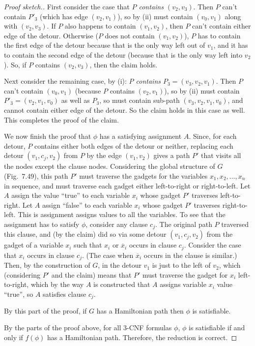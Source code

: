 \documentclass[11pt]{article}
\begin{document}
\begin{proof}[Proof sketch.]
  First consider the case that \emph{$P$ contains $(v_2,v_3)$}.
  Then $P$ can't contain $P'_3$ (which has edge $(v_2,v_1)$),
  so by (ii) must contain $(v_0,v_1)$ along with $(v_2,v_3)$.
  If $P$ also happens to contain $(v_1,v_2)$, 
  then $P$ can't contain either edge of the detour.
  Otherwise ($P$ does not contain $(v_1,v_2)$),
  $P$ has to contain the first edge of the detour
  because that is the only way left out of $v_1$,
  and it has to contain the second edge of the detour
  (because that is the only way left into $v_2$).
  So, if $P$ contains $(v_2,v_3)$, then the claim holds.

  Next consider the remaining case, by (i):
  \emph{$P$ contains $P_3=(v_3,v_2,v_1)$}.
  Then $P$ can't contain $(v_0,v_1)$ (because $P$ contains $(v_2,v_1)$),
  so by (ii) must contain $P'_3=(v_2,v_1,v_0)$ as well as $P_3$,
  so must contain sub-path $(v_3,v_2,v_1,v_0)$,
  and cannot contain either edge of the detour.
  So the claim holds in this case as well.
  This completes the proof of the claim.
  
  We now finish the proof that $\phi$ has a satisfying assignment $A$.
  Since, for each detour, $P$ contains either both edges of the detour or neither,
  replacing each detour $(v_1,c_j,v_2)$ from $P$ by the edge $(v_1,v_2)$
  gives a path $P'$ that visits all the nodes except the clause nodes.
  Considering the global structure of $G$ (Fig.~7.49), this path $P'$ 
  must traverse the gadgets for the variables $x_1, x_2, \ldots, x_n$
  in sequence, and must traverse each gadget either left-to-right
  or right-to-left.  Let $A$ assign the value ``true'' to each variable
  $x_i$ whose gadget $P'$ traverses left-to-right.
  Let $A$ assign ``false'' to each variable $x_i$
  whose gadget $P'$ traverses right-to-left.
  This is assignment assigns values to all the variables.
  To see that the assignment has to satisfy $\phi$,
  consider any clause $c_j$.
  The original path $P$ traversed this clause,
  and (by the claim) did so via some detour 
  $(v_1,c_j,v_2)$ from the gadget of a variable $x_i$
  such that $x_i$ or $\overline x_i$ occurs in clause $c_j$.
  Consider the case that $x_i$ occurs in clause $c_j$.
  (The case when $\overline x_i$ occurs in the clause is similar.)
  Then, by the construction of $G$, 
  in the detour $v_1$ is just to the left of $v_2$,
  which (considering $P'$ and the claim)
  means that $P'$ must traverse the gadget for $x_i$
  left-to-right, which by the way $A$ is constructed
  that $A$ assigns variable $x_i$ value ``true'',
  so $A$ satisfies clause $c_j$.

  By this part of the proof,
  if $G$ has a Hamiltonian path
  then $\phi$ is satisfiable.

  \smallskip

  By the parts of the proof above,
  for all 3-CNF formulas $\phi$,
  $\phi$ is satisfiable
  if and only if
  $f(\phi)$ has a Hamiltonian path.
  Therefore, the reduction is correct.
\end{proof}
\end{document}
